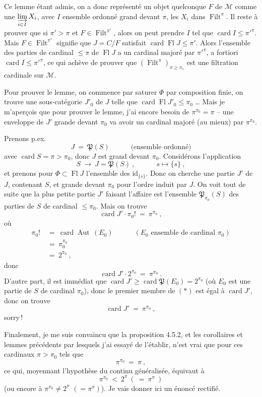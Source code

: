 \documentclass[11pt]{article}
\newcommand{\printedpage}[1]{\marginpar{\footnotesize p.~#1}}
\newcommand{\msp}[1]{\marginpar{\footnotesize [#1]}}
\newcommand{\card}{\operatorname{card}}
\newcommand{\Fl}{\operatorname{Fl}}
\newcommand{\Filt}{\operatorname{Filt}}
\newcommand{\Aut}{\operatorname{Aut}}
\begin{document}
Ce lemme étant admis, on a donc représenté un objet quelconque $F$ de $\mathcal{M}$ comme une $\varinjlim\limits_{i\in I} X_i$, avec $I$ ensemble ordonné grand devant $\pi$, les $X_i$ dans $\Filt^{\pi}$. Il reste à prouver que si $\pi' > \pi$ et $F \in \Filt^{\pi'}$, alors on peut prendre $I$ tel que $\card I \leqslant \pi'^{\pi}$. Mais $F \in \Filt^{\pi'}$ signifie que $J = C/F$ satisfait $\card\Fl J \leqslant \pi'$. Alors l'ensemble des parties de cardinal $\leqslant \pi$ de $\Fl J$ a un cardinal majoré par $\pi'^{\pi}$, a fortiori $\card I \leqslant \pi'^{\pi}$, ce qui achève de prouver que $(\Filt^{\pi})_{\pi\geqslant\pi_1}$ est une filtration cardinale sur $\mathcal{M}$.

\msp{page 114}

Pour prouver le lemme, on commence par saturer $\Phi$ par composition finie, on trouve une sous-catégorie $J'_0$ de $J$ telle que $\card\Fl J'_0 \leqslant \pi_0$ \ldots{} Mais je m'aperçois que pour prouver le lemme, j'ai encore besoin de $\pi^{\pi_0} = \pi$ -- une enveloppe de $J'$ grande devant $\pi_0$ va avoir un cardinal majoré (au mieux) par $\pi^{\pi_0}$.

Prenons p.ex.
\[
J \ =\ \mathfrak{P}(S) \qquad\quad \text{(ensemble ordonné)}
\]
avec $\card S = \pi > \pi_0$, donc $J$ est grand devant $\pi_0$. Considérons l'application
\[
S \ \longrightarrow\ J = \mathfrak{P}(S)\ , \qquad\quad s \longmapsto \{s\}\ ,
\]
et prenons pour $\Phi \subset \Fl J$ l'ensemble des $\mathrm{id}_{\{s\}}$. Donc on cherche une partie $J'$ de $J$, contenant $S$, et grande devant $\pi_0$ pour l'ordre induit par $J$. On voit tout de suite que la plus petite partie $J'$ faisant l'affaire est l'ensemble $\mathfrak{P}_{\pi_0}(S)$ des parties de $S$ de cardinal $\leqslant \pi_0$. Mais on trouve
\[
\card J' \cdot \pi_0! \ =\ \pi^{\pi_0}\ ,
\]
\printedpage{33}
\msp{page 115}
où
\[
\begin{aligned}
\pi_0! \ &=\ \card\Aut\,(E_0) \qquad\quad (E_0 \text{ ensemble de cardinal } \pi_0)\\
&=\ \pi_0^{\pi_0}\\
&=\ 2^{\pi_0}\ ,
\end{aligned}
\]
donc
\[
\card J' \cdot 2^{\pi_0} \ =\ \pi^{\pi_0}\ .
\tag*{$(*)$}
\]
D'autre part, il est immédiat que $\card J' \geqslant \card\mathfrak{P}(E_0) = 2^{\pi_0}$ (où $E_0$ est une partie de $S$ de cardinal $\pi_0$), donc le premier membre de $(*)$ est égal à $\card J'$, donc on trouve
\[
\card J' \ =\ \pi^{\pi_0}\ ,
\]
sorry\,!

Finalement, je me suis convaincu que la proposition 4.5.2, et les corollaires et lemmes précédents par lesquels j'ai essayé de l'établir, n'est vrai que pour ces cardinaux $\pi > \pi_0$ tels que
\[
\pi^{\pi_0} \ =\ \pi\ ,
\]
ce qui, moyennant l'hypothèse du continu généralisée, équivaut à
\[
\pi^{\pi_0} \ <\ 2^{\pi}\ (\ =\ \pi^{\pi}\ )
\]
(ou encore à $\pi^{\pi_0} \neq 2^{\pi}$ $(= \pi^{\pi})$). Je vais donner
\msp{page 116}
ici un énoncé rectifié.
\end{document}
